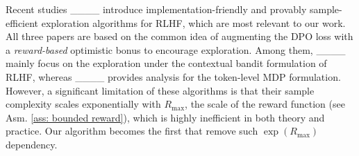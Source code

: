 Recent studies ____ introduce implementation-friendly and provably sample-efficient exploration algorithms for RLHF, which are most relevant to our work.
All three papers are based on the common idea of augmenting the DPO loss with a \textit{reward-based} optimistic bonus to encourage exploration. 
Among them, ____ mainly focus on the exploration under the contextual bandit formulation of RLHF, whereas ____ provides analysis for the token-level MDP formulation.
However, a significant limitation of these algorithms is that their sample complexity scales exponentially with $ R_{\text{max}}$, the scale of the reward function (see Asm. \ref{ass: bounded reward}), which is highly inefficient in both theory and practice. Our algorithm becomes the first that remove such $\exp(R_{\text{max}})$ dependency.